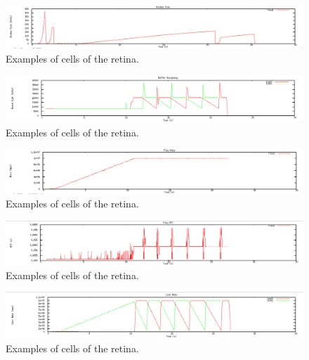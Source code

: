 \documentclass[12pt]{article}
\begin{document}
\begin{figure}[!ht]
\centering \includegraphics[bb= 0 0 1300 250, scale=.35]{figures/Test1_Tahoe/window_size.png}
\caption{Examples of cells of the retina.}
\label{fig:test1_tahoe_window_size}
\end{figure}

\newpage


\begin{figure}[!ht]
\centering \includegraphics[bb= 0 0 1300 250, scale=.35]{figures/Test1_Vegas/buffer_occ.png}
\caption{Examples of cells of the retina.}
\label{fig:test1_vegas_buffer_occ}
\end{figure}

\begin{figure}[!ht]
\centering \includegraphics[bb= 0 0 1300 250, scale=.35]{figures/Test1_Vegas/flow_rate.png}
\caption{Examples of cells of the retina.}
\label{fig:test1_vegas_flow_rate}
\end{figure}

\begin{figure}[!ht]
\centering \includegraphics[bb= 0 0 1300 250, scale=.35]{figures/Test1_Vegas/flow_rtt.png}
\caption{Examples of cells of the retina.}
\label{fig:test1_vegas_flow_rtt}
\end{figure}

\begin{figure}[!ht]
\centering \includegraphics[bb= 0 0 1300 250, scale=.35]{figures/Test1_Vegas/link_rate.png}
\caption{Examples of cells of the retina.}
\label{fig:test1_vegas_link_rate}
\end{figure}
\end{document}
